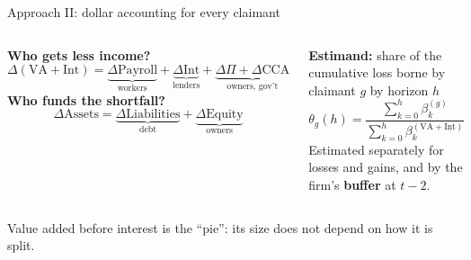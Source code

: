 \documentclass[aspectratio=169,11pt]{beamer}
\newlength{\safezone}
\newcommand{\hl}[1]{{\color{WarmAmber}\bfseries #1}}
\newcommand{\muted}[1]{{\color{CoolGray}#1}}
\begin{document}
\begin{frame}[label=approach2]{Approach II: dollar accounting for every claimant}
  \begin{columns}[T,onlytextwidth]
    \textbf{Who gets less income?}\\[-2pt]
    {\small
    \[
      \Delta(\text{VA}+\text{Int}) = \underbrace{\Delta \text{Payroll}}_{\text{workers}}
      + \underbrace{\Delta \text{Int}}_{\text{lenders}}
      + \underbrace{\Delta \Pi + \Delta \text{CCA}}_{\text{owners, gov't}}
    \]}
    \textbf{Who funds the shortfall?}\\[-2pt]
    {\small
    \[
      \Delta \text{Assets} = \underbrace{\Delta \text{Liabilities}}_{\text{debt}} + \underbrace{\Delta \text{Equity}}_{\text{owners}}
    \]}
    \begin{keybox}
      \textbf{Estimand:} share of the cumulative loss borne by claimant $g$ by horizon $h$
      \[
        \theta_g(h)=\frac{\sum_{k=0}^{h}\beta^{(g)}_k}{\sum_{k=0}^{h}\beta^{(\text{VA}+\text{Int})}_k}
      \]
      \small Estimated separately for losses and gains, and by the firm's \hl{buffer} at $t-2$.
    \end{keybox}
  \end{columns}

  \vspace{6pt}
  {\small\muted{Value added before interest is the ``pie'': its size does not depend on how it is split.}\par}
  \vspace{2pt}
  \hfill\hyperlink{hyp}{}\hspace{\safezone}
\end{frame}
\end{document}

